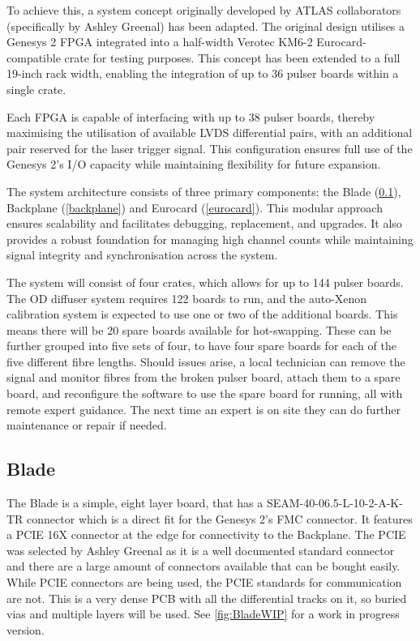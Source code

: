 \documentclass[a4paper,11pt]{article}
\begin{document}
To achieve this, a system concept originally developed by ATLAS collaborators (specifically by Ashley Greenal) has been adapted. The original design utilises a Genesys 2 FPGA integrated into a half-width Verotec KM6-2 \cite{KM6-2} Eurocard-compatible crate for testing purposes. This concept has been extended to a full 19-inch rack width, enabling the integration of up to 36 pulser boards within a single crate.

Each FPGA is capable of interfacing with up to 38 pulser boards, thereby maximising the utilisation of available LVDS differential pairs, with an additional pair reserved for the laser trigger signal. This configuration ensures full use of the Genesys 2’s I/O capacity while maintaining flexibility for future expansion.

The system architecture consists of three primary components: the Blade (\cref{blade}), Backplane (\cref{backplane}) and Eurocard (\cref{eurocard}). This modular approach ensures scalability and facilitates debugging, replacement, and upgrades. It also provides a robust foundation for managing high channel counts while maintaining signal integrity and synchronisation across the system.

The system will consist of four crates, which allows for up to 144 pulser boards. The OD diffuser system requires 122 boards to run, and the auto-Xenon calibration system is expected to use one or two of the additional boards. This means there will be 20 spare boards available for hot-swapping. These can be further grouped into five sets of four, to have four spare boards for each of the five different fibre lengths. Should issues arise, a local technician can remove the signal and monitor fibres from the broken pulser board, attach them to a spare board, and reconfigure the software to use the spare board for running, all with remote expert guidance. The next time an expert is on site they can do further maintenance or repair if needed.

\subsection{Blade}\label{blade}

The Blade is a simple, eight layer board, that has a SEAM-40-06.5-L-10-2-A-K-TR \cite{SamtecSeam} connector which is a direct fit for the Genesys 2's FMC connector. It features a PCIE 16X connector at the edge for connectivity to the Backplane. The PCIE was selected by Ashley Greenal as it is a well documented standard connector and there are a large amount of connectors available that can be bought easily. While PCIE connectors are being used, the PCIE standards for communication are not. This is a very dense PCB with all the differential tracks on it, so buried vias and multiple layers will be used. See \cref{fig:BladeWIP} for a work in progress version.
\end{document}
